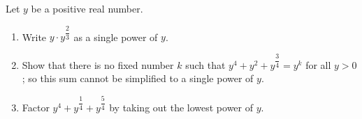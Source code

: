 Let $y$ be a positive real number.
\begin{enumerate}
\item[(a)] Write $y\cdot y^{\dfrac23}$ as a single power of $y$.
\item[(b)] Show that there is no fixed number $k$ such that $y^4+y^2+y^{\dfrac34}=y^k$ for all $y>0$; so this sum cannot be simplified to a single power of $y$.
\item[(c)] Factor $y^4+y^{\dfrac14}+y^{\dfrac54}$ by taking out the lowest power of $y$.
\end{enumerate}
